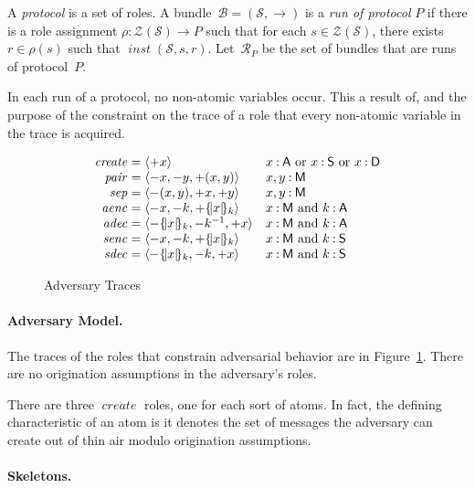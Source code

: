 \documentclass[12pt]{article}
\newcommand{\fn}[1]{\ensuremath{\operatorname{\mathit{#1}}}}
\newcommand{\srt}[1]{\ensuremath{\mathsf{#1}}}
\newcommand{\typ}{\mathbin:}
\newcommand{\seq}[1]{\ensuremath{\langle#1\rangle}}
\newcommand{\enc}[2]{\ensuremath{\{\!|#1|\!\}_{#2}}}
\newcommand{\invk}[1]{{#1}^{-1}}
\newcommand{\inbnd}{\mathord -}
\newcommand{\outbnd}{\mathord +}
\newcommand{\ssp}{\ensuremath{\mathcal{S}}}
\newcommand{\bun}{\ensuremath{\mathcal{B}}}
\newcommand{\strands}{\ensuremath{\mathcal{Z}}}
\newcommand{\run}{\mathcal{R}}
\newcommand{\rl}{\ensuremath{\rho}}
\begin{document}
A \emph{protocol} is a set of roles.  A bundle~$\bun=(\ssp,\to)$ is a
\emph{run of protocol} $P$ if there is a role assignment
$\rl\typ\strands(\ssp)\to P$ such that for each $s\in\strands(\ssp)$,
there exists $r\in\rl(s)$ such that $\fn{inst}(\ssp,s,r)$.
Let~$\run_P$ be the set of bundles that are runs of protocol~$P$.

In each run of a protocol, no non-atomic variables occur.  This a
result of, and the purpose of the constraint on the trace of a role
that every non-atomic variable in the trace is acquired.

\begin{figure}
$$\begin{array}{r@{{}={}}ll}
\fn{create}&\seq{\outbnd x}&
\mbox{$x\typ\srt{A}$ or $x\typ\srt{S}$ or $x\typ\srt{D}$}\\
\fn{pair}&
\seq{\inbnd x,\inbnd y,\outbnd (x,y)}&
x,y\typ\srt{M}\\
\fn{sep}&
\seq{\inbnd (x,y),\outbnd x,\outbnd y}&
x,y\typ\srt{M}\\
\fn{aenc}&
\seq{\inbnd x,\inbnd k,\outbnd \enc{x}{k}}&
\mbox{$x\typ\srt{M}$ and $k\typ\srt{A}$}\\
\fn{adec}&
\seq{\inbnd \enc{x}{k},\inbnd\invk{k},\outbnd x}&
\mbox{$x\typ\srt{M}$ and $k\typ\srt{A}$}\\
\fn{senc}&
\seq{\inbnd x,\inbnd k,\outbnd \enc{x}{k}}&
\mbox{$x\typ\srt{M}$ and $k\typ\srt{S}$}\\
\fn{sdec}&
\seq{\inbnd \enc{x}{k},\inbnd k,\outbnd x}&
\mbox{$x\typ\srt{M}$ and $k\typ\srt{S}$}
\end{array}$$
\caption{Adversary Traces}\label{fig:adversary}
\end{figure}

\paragraph{Adversary Model.}
The traces of the roles that constrain adversarial
behavior are in Figure~\ref{fig:adversary}.  There are no origination
assumptions in the adversary's roles.

There are three \fn{create} roles, one for each sort of atoms.  In
fact, the defining characteristic of an atom is it denotes the set of
messages the adversary can create out of thin air modulo origination
assumptions.

\paragraph{Skeletons.}
\end{document}
